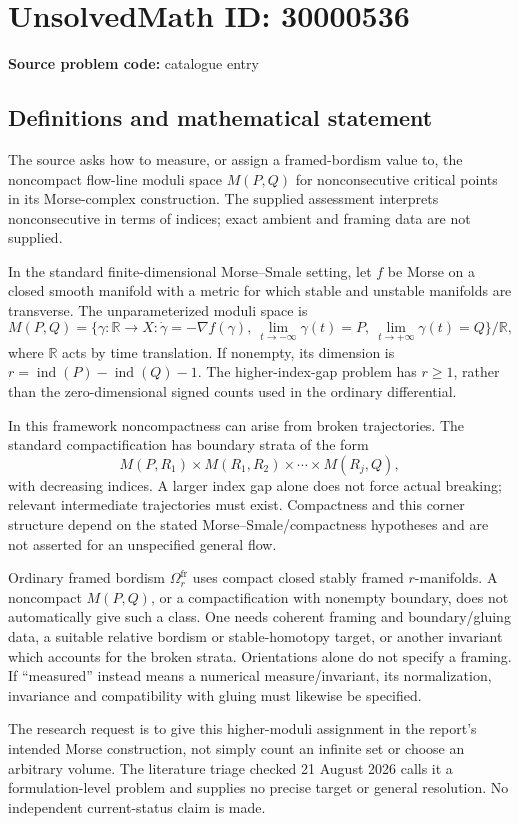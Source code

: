 \documentclass[11pt]{article}
\newcommand{\R}{\mathbb{R}}
\begin{document}
\section*{UnsolvedMath ID: 30000536}
\textbf{Source problem code:} catalogue entry
\subsection{Definitions and mathematical statement}
The source asks how to measure, or assign a framed-bordism value to, the noncompact flow-line moduli space $M(P,Q)$ for nonconsecutive critical points in its Morse-complex construction. The supplied assessment interprets nonconsecutive in terms of indices; exact ambient and framing data are not supplied.

In the standard finite-dimensional Morse--Smale setting, let $f$ be Morse on a closed smooth manifold with a metric for which stable and unstable manifolds are transverse. The unparameterized moduli space is
\[
 M(P,Q)=\{\gamma:\R\to X:\dot\gamma=-\nabla f(\gamma),
 \ \lim_{t\to-\infty}\gamma(t)=P,
 \ \lim_{t\to+\infty}\gamma(t)=Q\}/\R,
\]
where $\R$ acts by time translation. If nonempty, its dimension is $r=\operatorname{ind}(P)-\operatorname{ind}(Q)-1$. The higher-index-gap problem has $r\geq1$, rather than the zero-dimensional signed counts used in the ordinary differential.

In this framework noncompactness can arise from broken trajectories. The standard compactification has boundary strata of the form
\[
 M(P,R_1)\times M(R_1,R_2)\times\cdots\times M(R_j,Q),
\]
with decreasing indices. A larger index gap alone does not force actual breaking; relevant intermediate trajectories must exist. Compactness and this corner structure depend on the stated Morse--Smale/compactness hypotheses and are not asserted for an unspecified general flow.

Ordinary framed bordism $\Omega_r^{\mathrm{fr}}$ uses compact closed stably framed $r$-manifolds. A noncompact $M(P,Q)$, or a compactification with nonempty boundary, does not automatically give such a class. One needs coherent framing and boundary/gluing data, a suitable relative bordism or stable-homotopy target, or another invariant which accounts for the broken strata. Orientations alone do not specify a framing. If ``measured'' instead means a numerical measure/invariant, its normalization, invariance and compatibility with gluing must likewise be specified.

The research request is to give this higher-moduli assignment in the report's intended Morse construction, not simply count an infinite set or choose an arbitrary volume. The literature triage checked 21 August 2026 calls it a formulation-level problem and supplies no precise target or general resolution. No independent current-status claim is made.
\end{document}
